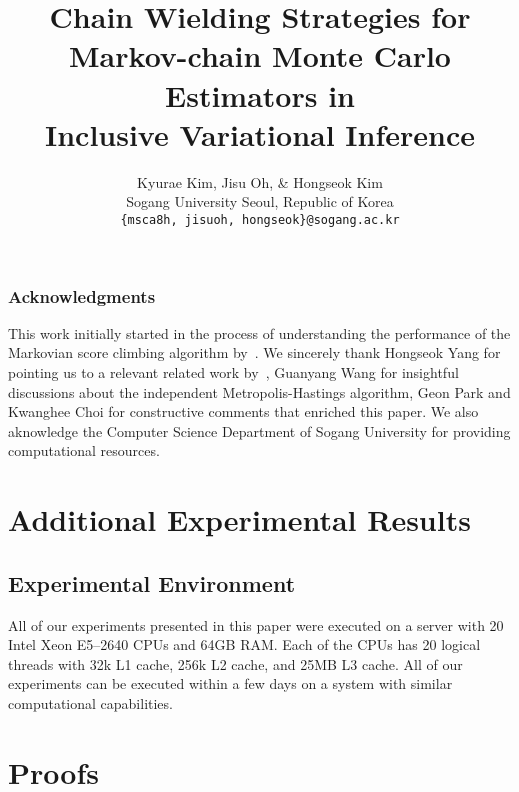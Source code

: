\documentclass{article} %
\title{Chain Wielding Strategies for \\ Markov-chain Monte Carlo Estimators in \\ Inclusive Variational Inference}
\author{Kyurae Kim, Jisu Oh, \& Hongseok Kim \\
Sogang University
  Seoul, Republic of Korea \\
\texttt{\{msca8h, jisuoh, hongseok\}@sogang.ac.kr}
}
\begin{document}
\maketitle

\begin{abstract}
  
\end{abstract}








\subsubsection*{Acknowledgments}
  This work initially started in the process of understanding the performance of the Markovian score climbing algorithm by~\citet{NEURIPS2020_b2070693}.
  We sincerely thank Hongseok Yang for pointing us to a relevant related work by~\citet{kim2021adaptive}, Guanyang Wang for insightful discussions about the independent Metropolis-Hastings algorithm, Geon Park and Kwanghee Choi for constructive comments that enriched this paper.
  We also aknowledge the Computer Science Department of Sogang University for providing computational resources.




\newpage
\appendix


\section{Additional Experimental Results}
\subsection{Experimental Environment}\label{section:resources}
All of our experiments presented in this paper were executed on a server with 20 Intel Xeon E5--2640 CPUs and 64GB RAM.
Each of the CPUs has 20 logical threads with 32k L1 cache, 256k L2 cache, and 25MB L3 cache.
All of our experiments can be executed within a few days on a system with similar computational capabilities.






\section{Proofs}
%
\printProofs
\end{document}

